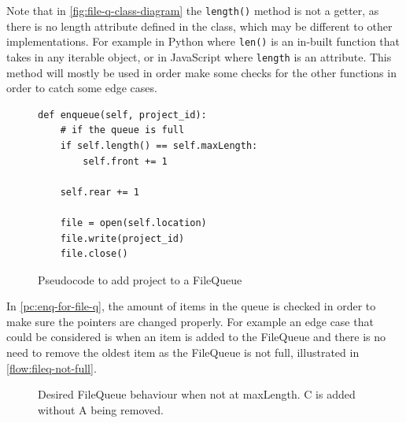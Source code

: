 \documentclass[11pt]{article}
\begin{document}
                Note that in \autoref{fig:file-q-class-diagram} the \verb|length()| method is not a getter, as there is no length attribute defined in the class, which may be different to other implementations. For example in Python where \verb|len()| is an in-built function that takes in any iterable object, or in JavaScript where \verb|length| is an attribute. This method will mostly be used in order make some checks for the other functions in order to catch some edge cases. 

                \begin{figure}[!h]
                    \begin{verbatim}
def enqueue(self, project_id):
    # if the queue is full
    if self.length() == self.maxLength:
        self.front += 1

    self.rear += 1
        
    file = open(self.location)
    file.write(project_id)
    file.close()
                    \end{verbatim}
                    \caption{Pseudocode to add project to a FileQueue}
                    \label{pc:enq-for-file-q}
                \end{figure}

                In \autoref{pc:enq-for-file-q}, the amount of items in the queue is checked in order to make sure the pointers are changed properly. For example an edge case that could be considered is when an item is added to the FileQueue and there is no need to remove the oldest item as the FileQueue is not full, illustrated in \autoref{flow:fileq-not-full}.

                \begin{figure}[!h]
                    \centering
                    \caption{Desired FileQueue behaviour when not at maxLength. C is added without A being removed.}
                    \label{flow:fileq-not-full}
                \end{figure}
\end{document}
